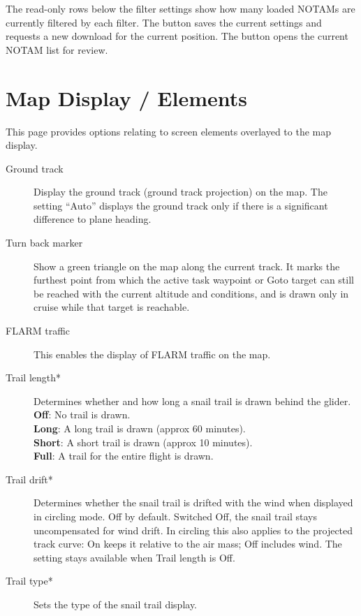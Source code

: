 The read-only rows below the filter settings show how many loaded NOTAMs
are currently filtered by each filter.  The  button saves
the current settings and requests a new download for the current
position.  The  button opens the current NOTAM list for
review.


\section{Map Display / Elements}\label{sec:map-elements}

This page provides options relating to screen elements overlayed to the map display.

\begin{description}
\item[Ground track]  Display the ground track (ground track projection) on the map.
  The setting ``Auto'' displays the ground track only if there is a significant
  difference to plane heading.
\item[Turn back marker]  Show a green triangle on the map along the current
  track. It marks the furthest point from which the active task waypoint or
  Goto target can still be reached with the current altitude and conditions,
  and is drawn only in cruise while that target is reachable.
\item[FLARM traffic]  \label{conf:flarm-on-map} This enables the display of FLARM 
  traffic on the map.
\item[Trail length*] \label{conf:snailtrail} Determines whether and how long a
  snail trail is drawn behind the glider. \\
  {\bf Off}: No trail is drawn. \\
  {\bf Long}: A long trail is drawn (approx 60 minutes). \\
  {\bf Short}: A short trail is drawn (approx 10 minutes). \\
  {\bf Full}: A trail for the entire flight is drawn.
\item[Trail drift*] \label{conf:traildrift} Determines whether the
  snail trail is drifted with the wind when displayed in circling mode.  Off by
  default.  Switched Off, the snail trail stays uncompensated for wind drift.
  In circling this also applies to the projected track curve: On keeps it
  relative to the air mass; Off includes wind.  The setting stays
  available when Trail length is Off.
\item[Trail type*] \label{conf:snailtype} Sets the type of the snail trail display. \\

\end{description}
